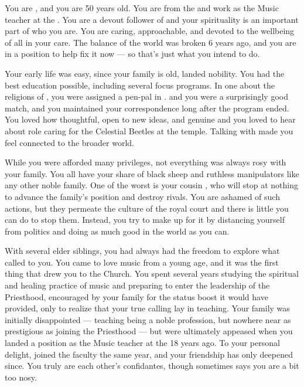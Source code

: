 \documentclass[char]{GL2020}
\begin{document}
\name{\cMusic{}}

You are \cMusic{\intro}, and you are 50 years old. You are from the \pFarm{} and work as the Music teacher at the \pSchool{}. You are a devout follower of \cFarmGod{} and your spirituality is an important part of who you are. You are caring, approachable, and devoted to the wellbeing of all in your care. The balance of the world was broken 6 years ago, and you are in a position to help fix it now — so that's just what you intend to do.

Your early life was easy, since your family is old, landed nobility. You had the best education possible, including several focus programs. In one about the religions of \pEarth{}, you were assigned a pen-pal in \pTech{}. \cBeetle{\full} and you were a surprisingly good match, and you maintained your correspondence long after the program ended. You loved how thoughtful, open to new ideas, and genuine \cBeetle{\theywere} and you loved to hear about \cBeetle{\their} role caring for the Celestial Beetles at the temple. Talking with \cBeetle{\them} made you feel connected to the broader world.   

While you were afforded many privileges, not everything was always rosy with your family. You all have your share of black sheep and ruthless manipulators like any other noble family. One of the worst is your cousin \cEvilNemesis{\full}, who will stop at nothing to advance the family's position and destroy rivals. You are ashamed of such actions, but they permeate the culture of the royal court and there is little you can do to stop them. Instead, you try to make up for it by distancing yourself from \pFarm{} politics and doing as much good in the world as you can. 

With several elder siblings, you had always had the freedom to explore what called to you. You came to love music from a young age, and it was the first thing that drew you to the Church. You spent several years studying the spiritual and healing practice of music and preparing to enter the leadership of the Priesthood, encouraged by your family for the status boost it would have provided, only to realize that your true calling lay in teaching. Your family was initially disappointed — teaching being a noble profession, but nowhere near as prestigious as joining the Priesthood — but were ultimately appeased when you landed a position as the Music teacher at the \pSchool{} 18 years ago. To your personal delight, \cBeetle{} joined the faculty the same year, and your friendship has only deepened since. You truly are each other’s confidantes, though sometimes \cBeetle{}says you are a bit too nosy.  
\end{document}
